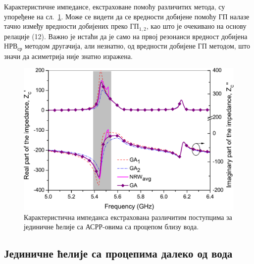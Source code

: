 Карактеристичне импедансе, екстраховане помоћу различитих метода, су упоређене на сл.~\ref{fig7}. Може се видети да се вредности добијене помоћу $ГП$ налазе тачно између вредности добијених преко $ГП_{1,2}$, као што је очекивано на основу релације (12). Важно је истаћи да је само на првој резонанси вредност добијена $НРВ_{ср}$ методом другачија, али незнатно, од вредности добијене $ГП$ методом, што значи да асиметрија није знатно изражена.
\begin{figure}[!t]
\centering
\includegraphics[scale=\SkalaB]{slike/11a.pdf}
\caption{Карактеристична импеданса екстрахована различитим поступцима за јединичне ћелије са АСРР-овима са процепом близу вода.}
\label{fig7}
\end{figure} 

\subsection{Јединичне ћелије са процепима далеко од вода}

